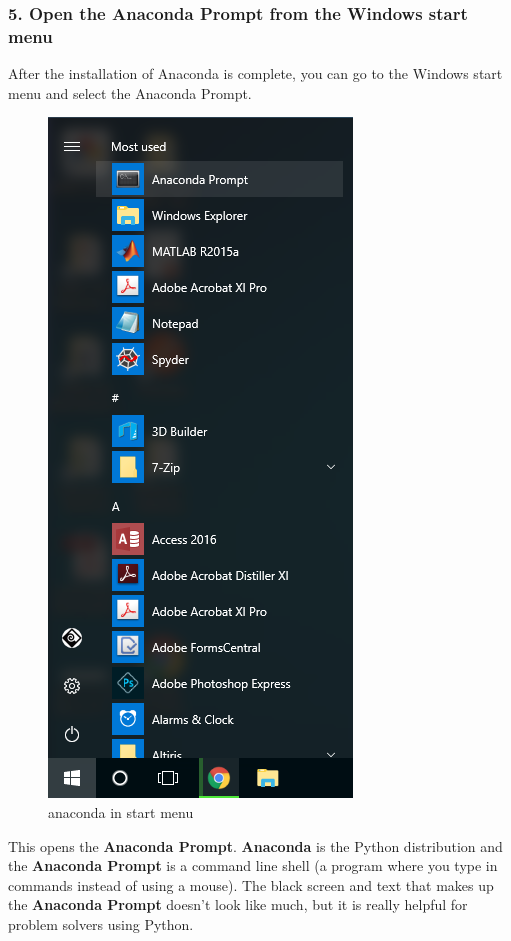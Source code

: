\documentclass{book}
\makeatletter
\def\maxwidth{\ifdim\Gin@nat@width>\linewidth\linewidth
    \else\Gin@nat@width\fi}
\let\Oldincludegraphics\includegraphics
\renewcommand{\includegraphics}[1]{\Oldincludegraphics[width=.8\maxwidth]{#1}}
\makeatother
\begin{document}
    
        \subsubsection{5. Open the Anaconda Prompt from the Windows start
menu}\label{open-the-anaconda-prompt-from-the-windows-start-menu}

After the installation of Anaconda is complete, you can go to the
Windows start menu and select the Anaconda Prompt.

\begin{figure}
\centering
\includegraphics{images/anaconda_from_start_menu.png}
\caption{anaconda in start menu}
\end{figure}

This opens the \textbf{Anaconda Prompt}. \textbf{Anaconda} is the Python
distribution and the \textbf{Anaconda Prompt} is a command line shell (a
program where you type in commands instead of using a mouse). The black
screen and text that makes up the \textbf{Anaconda Prompt} doesn't look
like much, but it is really helpful for problem solvers using Python.
\end{document}

